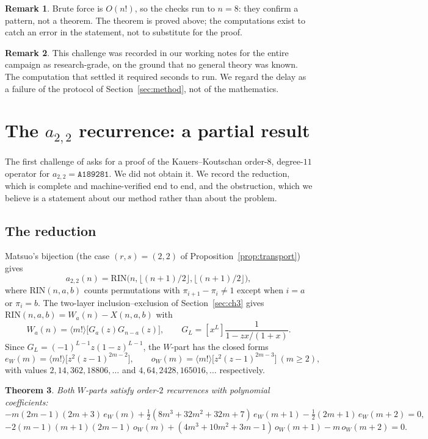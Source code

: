 \documentclass[11pt]{article}
\newtheorem{theorem}{Theorem}[section]
\theoremstyle{definition}
\newtheorem{remark}[theorem]{Remark}
\begin{document}
\begin{remark}
Brute force is $O(n!)$, so the checks run to $n=8$: they confirm a pattern, not
a theorem. The theorem is proved above; the computations exist to catch an
error in the statement, not to substitute for the proof.
\end{remark}

\begin{remark}
This challenge was recorded in our working notes for the entire campaign as
research-grade, on the ground that no general theory was known. The computation
that settled it required seconds to run. We regard the delay as a failure of
the protocol of Section~\ref{sec:method}, not of the mathematics.
\end{remark}

\section{The $a_{2,2}$ recurrence: a partial result}\label{sec:a22}

The first challenge of \cite{SZ} asks for a proof of the Kauers--Koutschan
order-$8$, degree-$11$ operator for $a_{2,2}=\texttt{A189281}$. We did not
obtain it. We record the reduction, which is complete and machine-verified end
to end, and the obstruction, which we believe is a statement about our method
rather than about the problem.

\subsection{The reduction}

Matsuo's bijection (the case $(r,s)=(2,2)$ of
Proposition~\ref{prop:transport}) gives
\[
  a_{2,2}(n)=\mathrm{RIN}\bigl(n,\lfloor(n+1)/2\rfloor,\lfloor(n+1)/2\rfloor\bigr),
\]
where $\mathrm{RIN}(n,a,b)$ counts permutations with
$\pi_{i+1}-\pi_i\ne1$ except when $i=a$ or $\pi_i=b$. The two-layer
inclusion--exclusion of Section~\ref{sec:ch3} gives
$\mathrm{RIN}(n,a,b)=W_a(n)-X(n,a,b)$ with
\[
  W_a(n)=\langle m!\rangle\bigl[G_a(z)G_{n-a}(z)\bigr],
  \qquad G_L=[x^L]\frac{1}{1-zx/(1+x)} .
\]
Since $G_L=(-1)^{L-1}z(1-z)^{L-1}$, the $W$-part has the closed forms
\[
  e_W(m)=\langle m!\rangle\bigl[z^{2}(z-1)^{2m-2}\bigr],\qquad
  o_W(m)=\langle m!\rangle\bigl[z^{2}(z-1)^{2m-3}\bigr]\ (m\ge2),
\]
with values $2,14,362,18806,\dots$ and $4,64,2428,165016,\dots$ respectively.

\begin{theorem}\label{thm:W}
Both $W$-parts satisfy order-$2$ recurrences with polynomial coefficients:
\[
  -m(2m-1)(2m+3)\,e_W(m)+\tfrac12(8m^{3}+32m^{2}+32m+7)\,e_W(m+1)
  -\tfrac12(2m+1)\,e_W(m+2)=0,
\]
\[
  -2(m-1)(m+1)(2m-1)\,o_W(m)+(4m^{3}+10m^{2}+3m-1)\,o_W(m+1)
  -m\,o_W(m+2)=0 .
\]
\end{theorem}
\end{document}
